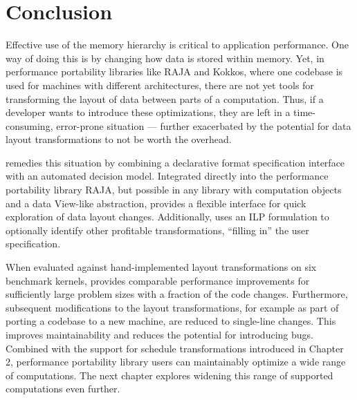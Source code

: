 \section{Conclusion}

Effective use of the memory hierarchy is critical to application performance.
One way of doing this is by changing how data is stored within memory.
Yet, in performance portability libraries like RAJA and Kokkos, where one codebase is used for machines with different architectures, there are not yet tools for transforming the layout of data between parts of a computation. 
Thus, if a developer wants to introduce these optimizations, they are left in a time-consuming, error-prone situation --- further exacerbated by the potential for data layout transformations to not be worth the overhead.

\FormatDecisions remedies this situation by combining a declarative format specification interface with an automated decision model.
Integrated directly into the performance portability library RAJA, but possible in any library with computation objects and a data View-like abstraction, \FormatDecisions{} provides a flexible interface for quick exploration of data layout changes. 
Additionally, \FormatDecisions{} uses an ILP formulation to optionally identify other profitable transformations, \enquote{filling in} the user specification.

When evaluated against hand-implemented layout transformations on six benchmark kernels, \FormatDecisions{} provides comparable performance improvements for sufficiently large problem sizes with a fraction of the code changes.
Furthermore, subsequent modifications to the layout transformations, for example as part of porting a codebase to a new machine, are reduced to single-line changes. 
This improves maintainability and reduces the potential for introducing bugs.
Combined with the support for schedule transformations introduced in Chapter 2, performance portability library users can maintainably optimize a wide range of computations. 
The next chapter explores widening this range of supported computations even further.
